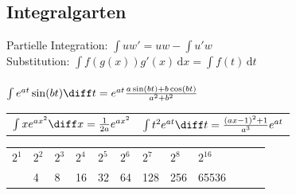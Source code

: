 \documentclass[fs, footer]{latex4ei}
\begin{document}
\begin{multicols*}{4}
{	\subsection{Integralgarten}
	Partielle Integration: $\int uw'=uw-\int u'w$\\
	Substitution: $\int f(g(x)) g'(x)\,\mathrm dx=\int f(t)\, \mathrm dt$\\
	\\
	$\int e^{at} \sin(bt) \diff t = e^{at} \frac{a \sin(bt) + b \cos(bt)}{a^2 + b^2}$\\
	\begin{tabular*}{\columnwidth}{@{\extracolsep\fill}ll@{}}
	$\int x e^{ax^2} \diff x = \frac{1}{2a} e^{ax^2}$ & $\int t^2 e^{at} \diff t = \frac{(ax-1)^2+1}{a^3} e^{at}$\\
	\end{tabular*} 
}

\begin{tabular}{llllllllllll}
	$2^1$ & $2^2$ & $2^3$ & $2^4$ & $2^5$ & $2^6$ & $2^7$ & $2^8$ & $2^{16}$\\ \mrule
	2 & 4 & 8 & 16 & 32 & 64 & 128 & 256 & 65536\\
\end{tabular}



\end{multicols*}
\end{document}
